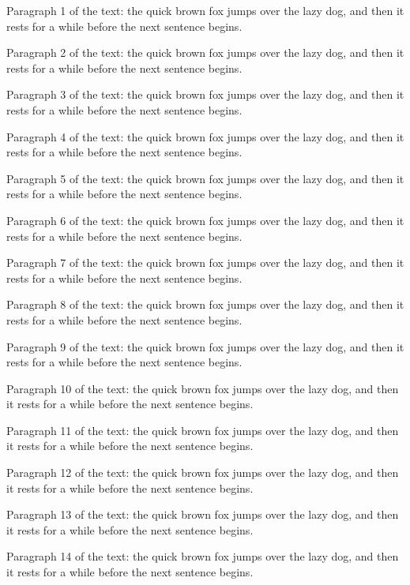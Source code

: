 \documentclass{article}
\begin{document}
Paragraph 1 of the text: the quick brown fox jumps over the lazy dog, and then it rests for a while before the next sentence begins.

Paragraph 2 of the text: the quick brown fox jumps over the lazy dog, and then it rests for a while before the next sentence begins.

Paragraph 3 of the text: the quick brown fox jumps over the lazy dog, and then it rests for a while before the next sentence begins.

Paragraph 4 of the text: the quick brown fox jumps over the lazy dog, and then it rests for a while before the next sentence begins.

Paragraph 5 of the text: the quick brown fox jumps over the lazy dog, and then it rests for a while before the next sentence begins.

Paragraph 6 of the text: the quick brown fox jumps over the lazy dog, and then it rests for a while before the next sentence begins.

Paragraph 7 of the text: the quick brown fox jumps over the lazy dog, and then it rests for a while before the next sentence begins.

Paragraph 8 of the text: the quick brown fox jumps over the lazy dog, and then it rests for a while before the next sentence begins.

Paragraph 9 of the text: the quick brown fox jumps over the lazy dog, and then it rests for a while before the next sentence begins.

Paragraph 10 of the text: the quick brown fox jumps over the lazy dog, and then it rests for a while before the next sentence begins.

Paragraph 11 of the text: the quick brown fox jumps over the lazy dog, and then it rests for a while before the next sentence begins.

Paragraph 12 of the text: the quick brown fox jumps over the lazy dog, and then it rests for a while before the next sentence begins.

Paragraph 13 of the text: the quick brown fox jumps over the lazy dog, and then it rests for a while before the next sentence begins.

Paragraph 14 of the text: the quick brown fox jumps over the lazy dog, and then it rests for a while before the next sentence begins.
\end{document}
